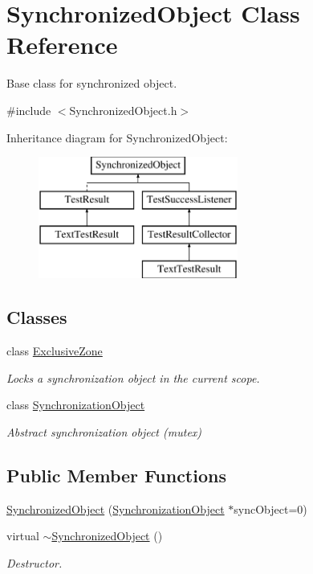 \hypertarget{class_synchronized_object}{\section{Synchronized\-Object Class Reference}
\label{class_synchronized_object}
}


Base class for synchronized object.  




{\ttfamily \#include $<$Synchronized\-Object.\-h$>$}

Inheritance diagram for Synchronized\-Object\-:\begin{figure}[H]
\begin{center}
\leavevmode
\includegraphics[height=4.000000cm]{class_synchronized_object}
\end{center}
\end{figure}
\subsection*{Classes}
\begin{DoxyCompactItemize}
\item 
class \hyperlink{class_synchronized_object_1_1_exclusive_zone}{Exclusive\-Zone}
\begin{DoxyCompactList}\small\item\em Locks a synchronization object in the current scope. \end{DoxyCompactList}\item 
class \hyperlink{class_synchronized_object_1_1_synchronization_object}{Synchronization\-Object}
\begin{DoxyCompactList}\small\item\em Abstract synchronization object (mutex) \end{DoxyCompactList}\end{DoxyCompactItemize}
\subsection*{Public Member Functions}
\begin{DoxyCompactItemize}
\item 
\hyperlink{class_synchronized_object_a9ae8017720af72aac92964f23b55d6f1}{Synchronized\-Object} (\hyperlink{class_synchronized_object_1_1_synchronization_object}{Synchronization\-Object} $\ast$sync\-Object=0)
\item 
virtual \hyperlink{class_synchronized_object_ae2c081d2e252b35a49edbf887579cfe0}{$\sim$\-Synchronized\-Object} ()
\begin{DoxyCompactList}\small\item\em Destructor. \end{DoxyCompactList}\end{DoxyCompactItemize}
